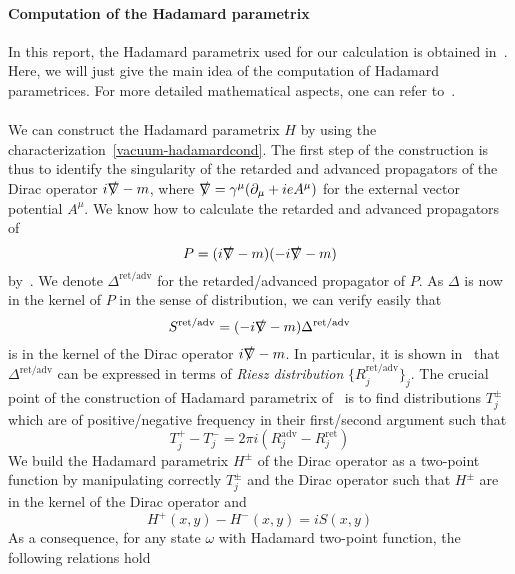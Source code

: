 \paragraph{Computation of the Hadamard parametrix}
In this report, the Hadamard parametrix used for our calculation is obtained in~\cite{Zahn2015}. 
Here, we will just give the main idea of the computation of Hadamard parametrices. 
For more detailed mathematical aspects, one can refer to~\cite{Bar2008}. \\\\
%
We can construct the Hadamard parametrix $H$ by using the characterization~\cref{vacuum-hadamardcond}. 
The first step of the construction is thus to identify the singularity of the retarded and advanced propagators of the Dirac operator $i\slashed{\nabla} - m$, where $\slashed{\nabla} = \gamma^\mu(\partial_\mu + ieA^\mu)$ for the external vector potential $A^\mu$. 
We know how to calculate the retarded and advanced propagators of 
\begin{equation*}
P = (i\slashed{\nabla} - m)(-i\slashed{\nabla} -m) 
\end{equation*}
by~\cite{Bar2008}.
We denote $\Delta^{\mathrm{ret/adv}}$ for the retarded/advanced propagator of $P$.
As $\Delta$ is now in the kernel of $P$ in the sense of distribution, 
we can verify easily that 
\begin{equation*}
S^{\textrm{ret/adv}} = (-i\slashed{\nabla} - m)\Delta^{\textrm{ret/adv}} 
\end{equation*}
is in the kernel of the Dirac operator $i\slashed{\nabla} - m$.
In particular, it is shown in~\cite{Bar2008} that $\Delta^{\mathrm{ret/adv}}$ can be expressed in terms of \textit{Riesz distribution} $\{R_j^{\mathrm{ret/adv}}\}_j$.
The crucial point of the construction of Hadamard parametrix of~\cite{Zahn2015} is to find distributions $T_j^{\pm}$ which are of positive/negative frequency in their first/second argument such that
\begin{equation*}
T_j^+ - T_j^- = 2\pi i(R_j^{\mathrm{adv}} - R_j^{\mathrm{ret}})
\end{equation*} 
We build the Hadamard parametrix $H^\pm$ of the Dirac operator as a two-point function by manipulating correctly $T_j^{\pm}$ and the Dirac operator such that $H^\pm$ are in the kernel of the Dirac operator 
and 
\begin{equation}\label{intro-hh}
H^+(x,y) - H^-(x,y) = i S(x,y)
\end{equation}
As a consequence, for any state $\omega$ with Hadamard two-point function, the following relations hold

